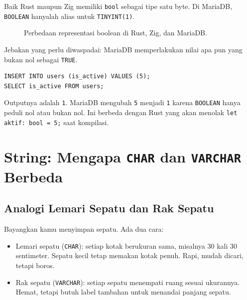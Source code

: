\documentclass[11pt,a4paper]{article}
\begin{document}
Baik Rust maupun Zig memiliki \texttt{bool} sebagai tipe satu byte. Di MariaDB, \texttt{BOOLEAN} hanyalah alias untuk \texttt{TINYINT(1)}.

\begin{figure}[H]
	\centering
	\caption{Perbedaan representasi boolean di Rust, Zig, dan MariaDB.}
	\label{fig:bool}
\end{figure}

Jebakan yang perlu diwaspadai: MariaDB memperlakukan nilai apa pun yang bukan nol sebagai \texttt{TRUE}.

\begin{lstlisting}[style=code]
INSERT INTO users (is_active) VALUES (5);
SELECT is_active FROM users;
\end{lstlisting}

Outputnya adalah \texttt{1}. MariaDB mengubah \texttt{5} menjadi \texttt{1} karena \texttt{BOOLEAN} hanya peduli nol atau bukan nol. Ini berbeda dengan Rust yang akan menolak \texttt{let aktif: bool = 5;} saat kompilasi.

\section{String: Mengapa \texttt{CHAR} dan \texttt{VARCHAR} Berbeda}

\subsection{Analogi Lemari Sepatu dan Rak Sepatu}

Bayangkan kamu menyimpan sepatu. Ada dua cara:

\begin{itemize}
	\item Lemari sepatu (\texttt{CHAR}): setiap kotak berukuran sama, misalnya 30 kali 30 sentimeter. Sepatu kecil tetap memakan kotak penuh. Rapi, mudah dicari, tetapi boros.
	\item Rak sepatu (\texttt{VARCHAR}): setiap sepatu menempati ruang sesuai ukurannya. Hemat, tetapi butuh label tambahan untuk menandai panjang sepatu.
\end{itemize}
\end{document}

